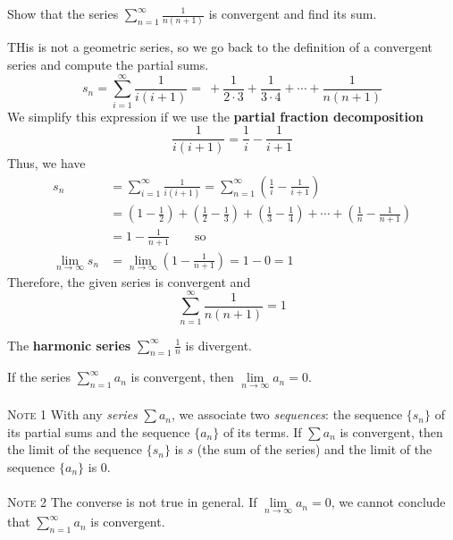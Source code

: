   \begin{example}
    Show that the series $ \displaystyle\sum_{n=1}^{\infty} \frac{1}{n(n+1)}$ is convergent and find its sum.
  \end{example}
  \begin{solution}
    THis is not a geometric series, so we go back to the definition of a convergent series and compute the partial sums.
    $$ s_n = \sum_{i=1}^{\infty} \frac{1}{i(i+1)} = \ + \frac{1}{2\cdot3} + \frac{1}{3\cdot4} + \cdots + \frac{1}{n(n+1)}$$
    We simplify this expression if we use the \textbf{partial fraction decomposition}
    $$ \frac{1}{i(i+1)} = \frac{1}{i}-\frac{1}{i+1}$$
    Thus, we have
    \begin{align*}
      s_n &= \sum_{i=1}^{\infty} \frac{1}{i(i+1)} = \sum_{n=1}^{\infty} \left(\frac{1}{i}-\frac{1}{i+1}\right) \\
          &= \left(1-\frac{1}{2}\right) + \left(\frac{1}{2}-\frac{1}{3}\right) + \left(\frac{1}{3}-\frac{1}{4}\right) + \cdots + \left(\frac{1}{n}-\frac{1}{n+1}\right) \\
          &= 1- \frac{1}{n+1} \qquad\text{so} \\
      \lim_{n\to\infty} s_n &= \lim_{n\to\infty} \left(1- \frac{1}{n+1}\right) = 1-0 = 1
    \end{align*}
    Therefore, the given series is convergent and
    $$\sum_{n=1}^{\infty} \frac{1}{n(n+1)}=1$$
  \end{solution}
  \begin{definition}
    The \textbf{harmonic series}
    $ \displaystyle\sum_{n=1}^{\infty} \frac{1}{n} $
    is divergent.
  \end{definition}
  \begin{theorem}
    If the series $ \displaystyle\sum_{n=1}^{\infty} a_n$ is convergent, then $\lim\limits_{n\to\infty} a_n = 0$.
    \\~\\
    \textsc{Note 1} With any \textit{series} $\sum a_n$, we associate two \textit{sequences}: the sequence $\{s_n\}$ of its partial sums and the sequence $\{a_n\}$ of its terms. If $\sum a_n$ is convergent, then the limit of the sequence $\{s_n\}$ is $s$ (the sum of the series) and the limit of the sequence $\{a_n\}$ is 0.
    \\~\\
    \textsc{Note 2} The converse is not true in general. If $\lim\limits_{n\to\infty} a_n = 0$, we cannot conclude that $ \displaystyle\sum_{n=1}^{\infty} a_n$ is convergent.
  \end{theorem}
